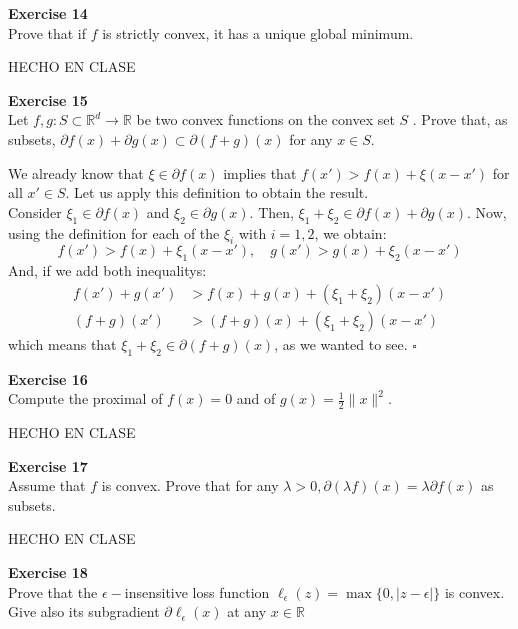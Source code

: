 \documentclass[11pt,table]{article}
\newcommand{\qed}{\hfill $\square$}
\newenvironment{problem}[2][Exercise]
    { \begin{mdframed}[backgroundcolor=gray!20] \textbf{#1 #2} \\}
    {  \end{mdframed}}
\newcommand\abs[1]{\lvert#1\rvert}
\newcommand\R{\mathbb R}
\begin{document}
\begin{problem}{14}
Prove that if \( f \)  is strictly convex, it has a unique global minimum.
\end{problem}

HECHO EN CLASE\\

\begin{problem}{15}
Let \( f,g: S \subset \mathbb{R}^d \to \mathbb{R} \)  be two convex functions on the convex set \( S \) . Prove that, as subsets, \(  \partial f(x) + \partial g(x) \subset \partial(f+g)(x) \) for any $x\in S$.
\end{problem}

We already know that \(\xi \in \partial f(x)\) implies that \(f(x') > f(x) + \xi(x-x')\) for all \(x' \in S\). Let us apply this definition to obtain the result.\\
Consider \(\xi_1 \in \partial f(x)\) and \(\xi_2 \in \partial g(x)\). Then, \(\xi_1 + \xi_2 \in \partial f(x) + \partial g(x)\). Now, using the definition for each of the \(\xi_i\) with \(i = 1,2\), we obtain:
\[
  f(x') > f(x) + \xi_1 (x-x'), \quad g(x') > g(x) + \xi_2(x-x')
\]
And, if we add both inequalitys:
\begin{align*}
  f(x') + g(x')        & > f(x) + g(x) + (\xi_1 + \xi_2)(x-x')        \\
  \left(f+g\right)(x') & >\left(f+g\right)(x) + (\xi_1 + \xi_2)(x-x')
\end{align*}
which means that \(\xi_1 + \xi_2 \in \partial \left(f+g\right)(x) \), as we wanted to see. \qed

\begin{problem}{16}
Compute the proximal of \( f(x) = 0 \) and of \( g(x) = \frac{1}{2}\|x\|^2 \).
\end{problem}

HECHO EN CLASE\\

\begin{problem}{17}
Assume that \( f \)  is convex. Prove that for any \( \lambda > 0, \partial(\lambda f)(x) = \lambda \partial f(x) \) as subsets.
\end{problem}

HECHO EN CLASE \\

\begin{problem}{18}
Prove that the \(\epsilon-\)insensitive loss function \(\ell_\epsilon(z) = \max\{0,\abs{z - \epsilon}\}\) is convex. Give also its subgradient \(\partial \ell_\epsilon(x)\) at any \(x \in \R\)
\end{problem}
\end{document}

